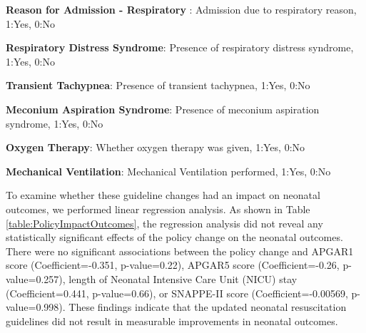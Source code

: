 \documentclass[11pt]{article}
\begin{document}
\begin{table}[h]
\begin{threeparttable}
\begin{tablenotes}
\item \textbf{Reason for Admission - Respiratory }: Admission due to respiratory reason, 1:Yes, 0:No
\item \textbf{Respiratory Distress Syndrome}: Presence of respiratory distress syndrome, 1:Yes, 0:No
\item \textbf{Transient Tachypnea}: Presence of transient tachypnea, 1:Yes, 0:No
\item \textbf{Meconium Aspiration Syndrome}: Presence of meconium aspiration syndrome, 1:Yes, 0:No
\item \textbf{Oxygen Therapy}: Whether oxygen therapy was given, 1:Yes, 0:No
\item \textbf{Mechanical Ventilation}: Mechanical Ventilation performed, 1:Yes, 0:No
\end{tablenotes}
\end{threeparttable}
\end{table}


To examine whether these guideline changes had an impact on neonatal outcomes, we performed linear regression analysis. As shown in Table {}\ref{table:PolicyImpactOutcomes}, the regression analysis did not reveal any statistically significant effects of the policy change on the neonatal outcomes. There were no significant associations between the policy change and APGAR1 score (Coefficient=-0.351, p-value=0.22), APGAR5 score (Coefficient=-0.26, p-value=0.257), length of Neonatal Intensive Care Unit (NICU) stay (Coefficient=0.441, p-value=0.66), or SNAPPE-II score (Coefficient=-0.00569, p-value=0.998). These findings indicate that the updated neonatal resuscitation guidelines did not result in measurable improvements in neonatal outcomes.
\end{document}
